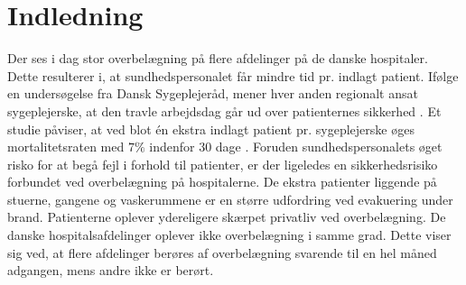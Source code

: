 \chapter{Indledning}
Der ses i dag stor overbelægning på flere afdelinger på de danske hospitaler. Dette resulterer i, at sundhedspersonalet får mindre tid pr. indlagt patient. Ifølge en undersøgelse fra Dansk Sygeplejeråd, mener hver anden regionalt ansat sygeplejerske, at den travle arbejdsdag går ud over patienternes sikkerhed \cite{Kjeldsen2015}. Et studie påviser, at ved blot én ekstra indlagt patient pr. sygeplejerske øges mortalitetsraten med $7 \%$ indenfor 30 dage  \cite{Aiken2014}. 
Foruden sundhedspersonalets øget risko for at begå fejl i forhold til patienter, er der ligeledes en sikkerhedsrisiko forbundet ved overbelægning på hospitalerne. De ekstra patienter liggende på stuerne, gangene og vaskerummene er en større udfordring ved evakuering under brand. Patienterne oplever ydereligere skærpet privatliv ved overbelægning. \cite{Madsen2014} 
De danske hospitalsafdelinger oplever ikke overbelægning i samme grad. Dette viser sig ved, at flere afdelinger berøres af overbelægning svarende til en hel måned adgangen, mens andre ikke er berørt. \cite{2015}

